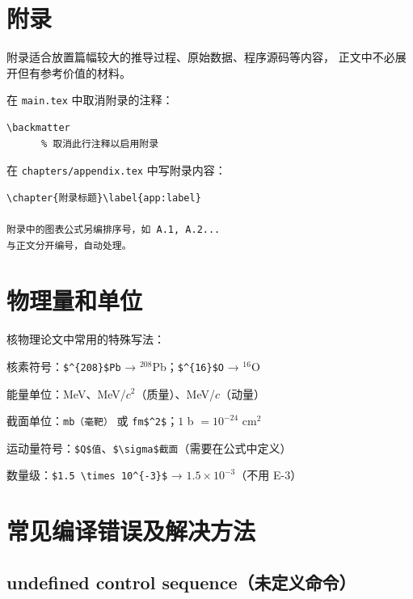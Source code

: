 \section{附录}

附录适合放置篇幅较大的推导过程、原始数据、程序源码等内容，
正文中不必展开但有参考价值的材料。

在 \texttt{main.tex} 中取消附录的注释：
\begin{verbatim}
\backmatter
      % 取消此行注释以启用附录

\end{verbatim}

在 \texttt{chapters/appendix.tex} 中写附录内容：
\begin{verbatim}
\chapter{附录标题}\label{app:label}

附录中的图表公式另编排序号，如 A.1, A.2...
与正文分开编号，自动处理。
\end{verbatim}

\section{物理量和单位}

核物理论文中常用的特殊写法：

\begin{compactitem}
    \item 核素符号：\verb|$^{208}$Pb| → $^{208}$Pb；\verb|$^{16}$O| → $^{16}$O
    \item 能量单位：MeV、MeV/$c^2$（质量）、MeV/$c$（动量）
    \item 截面单位：\verb|mb（毫靶）| 或 \verb|fm$^2$|；$1$ b $= 10^{-24}$ cm$^2$
    \item 运动量符号：\verb|$Q$值|、\verb|$\sigma$截面|（需要在公式中定义）
    \item 数量级：\verb|$1.5 \times 10^{-3}$| → $1.5 \times 10^{-3}$（不用 E-3）
\end{compactitem}

\section{常见编译错误及解决方法}

\subsection{undefined control sequence（未定义命令）}


